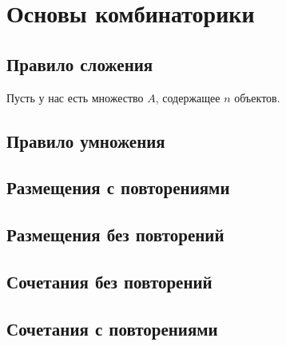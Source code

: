 \section{Основы комбинаторики}

\subsection{Правило сложения}

Пусть у нас есть множество $A$, содержащее $n$ объектов. 

\subsection{Правило умножения}

\subsection{Размещения с повторениями}

\subsection{Размещения без повторений}

\subsection{Сочетания без повторений}

\subsection{Сочетания с повторениями}